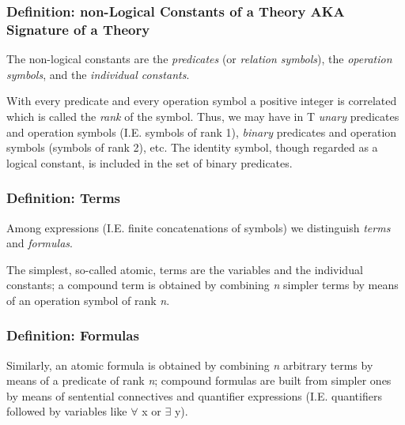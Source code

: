 \hypertarget{section}{%
\subsubsection{}\label{section}}

\hypertarget{definition-non-logical-constants-of-a-theory-aka-signature-of-a-theory}{%
\subsubsection{Definition: non-Logical Constants of a Theory AKA
Signature of a
Theory}\label{definition-non-logical-constants-of-a-theory-aka-signature-of-a-theory}}

The non-logical constants are the \emph{predicates} (or \emph{relation
symbols}), the \emph{operation symbols}, and the \emph{individual
constants}.

With every predicate and every operation symbol a positive integer is
correlated which is called the \emph{rank} of the symbol. Thus, we may
have in T \emph{unary} predicates and operation symbols (I.E. symbols of
rank 1), \emph{binary} predicates and operation symbols (symbols of rank
2), etc. The identity symbol, though regarded as a logical constant, is
included in the set of binary predicates.

\hypertarget{definition-terms}{%
\subsubsection{Definition: Terms}\label{definition-terms}}

Among expressions (I.E. finite concatenations of symbols) we distinguish
\emph{terms} and \emph{formulas}.

The simplest, so-called atomic, terms are the variables and the
individual constants; a compound term is obtained by combining \emph{n}
simpler terms by means of an operation symbol of rank \emph{n}.

\hypertarget{definition-formulas}{%
\subsubsection{Definition: Formulas}\label{definition-formulas}}

Similarly, an atomic formula is obtained by combining \emph{n} arbitrary
terms by means of a predicate of rank \emph{n}; compound formulas are
built from simpler ones by means of sentential connectives and
quantifier expressions (I.E. quantifiers followed by variables like $\forall$ x
or $\exists$ y).

